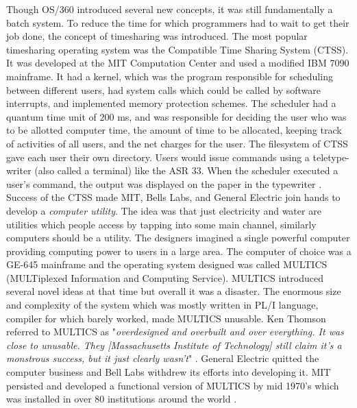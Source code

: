 Though OS/360 introduced several new concepts, it was still fundamentally a batch system. To reduce the time for which programmers had to wait to get their job done, the concept of timesharing was introduced. The most popular timesharing operating system was the Compatible Time Sharing System (CTSS). It was developed at the MIT Computation Center and used a modified IBM 7090 mainframe. It had a kernel, which was the program responsible for scheduling between different users, had system calls which could be called by software interrupts, and implemented memory protection schemes. The scheduler had a quantum time unit of 200 ms, and was responsible for deciding the user who was to be allotted computer time, the amount of time to be allocated, keeping track of activities of all users, and the net charges for the user. The filesystem of CTSS gave each user their own directory. Users would issue commands using a teletype-writer (also called a terminal) like the ASR 33. When the scheduler executed a user's command, the output was displayed on the paper in the typewriter \cite{peterson1985operating}\cite{tannenbaum2003operating}.\\  
Success of the CTSS made MIT, Bells Labs, and General Electric join hands to develop a \textit{computer utility}. The idea was that just electricity and water are utilities which people access by tapping into some main channel, similarly computers should be a utility. The designers imagined a single powerful computer providing computing power to users in a large area. The computer of choice was a GE-645 mainframe and the operating system designed was called MULTICS (MULTiplexed Information and Computing Service). MULTICS introduced several novel ideas at that time but overall it was a disaster. The enormous size and complexity of the system which was mostly written in PL/I language, compiler for which barely worked, made MULTICS unusable. Ken Thomson referred to MULTICS as "\textit{overdesigned and overbuilt and over everything. It was close to unusable. They [Massachusetts Institute of Technology] still claim it's a monstrous success, but it just clearly wasn't}" \cite{seibel2009coders}. General Electric quitted the computer business and Bell Labs withdrew its efforts into developing it. MIT persisted and developed a functional version of MULTICS by mid 1970's which was installed in over 80 institutions around the world \cite{tannenbaum2003operating}.\\
